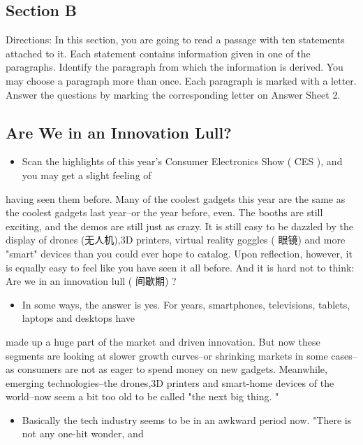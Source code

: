 \documentclass[UTF8,11pt]{ctexart}
\begin{document}
\subsection*{Section B}


Directions: In this section, you are going to read a passage with ten statements attached to it. Each statement contains information given in one of the paragraphs. Identify the paragraph from which the information is derived. You may choose a paragraph more than once. Each paragraph is marked with a letter. Answer the questions by marking the corresponding letter on Answer Sheet 2.


\subsection*{\textbf{Are We in an Innovation Lull?}}


\begin{itemize}[leftmargin=2em,itemsep=.2em,topsep=.4em]\item[A.] Scan the highlights of this year's Consumer Electronics Show ( CES ), and you may get a slight feeling of
\end{itemize}

having seen them before. Many of the coolest gadgets this year are the same as the coolest gadgets last year--or the year before, even. The booths are still exciting, and the demos are still just as crazy. It is still easy to be dazzled by the display of drones (无人机),3D printers, virtual reality goggles ( 眼镜) and more "smart" devices than you could ever hope to catalog. Upon reflection, however, it is equally easy to feel like you have seen it all before. And it is hard not to think: Are we in an innovation lull ( 间歇期) ?


\begin{itemize}[leftmargin=2em,itemsep=.2em,topsep=.4em]\item[B.] In some ways, the answer is yes. For years, smartphones, televisions, tablets, laptops and desktops have
\end{itemize}

made up a huge part of the market and driven innovation. But now these segments are looking at slower growth curves--or shrinking markets in some cases--as consumers are not as eager to spend money on new gadgets. Meanwhile, emerging technologies--the drones,3D printers and smart-home devices of the world--now seem a bit too old to be called "the next big thing. "


\begin{itemize}[leftmargin=2em,itemsep=.2em,topsep=.4em]\item[C.] Basically the tech industry seems to be in an awkward period now. "There is not any one-hit wonder, and
\end{itemize}
\end{document}
